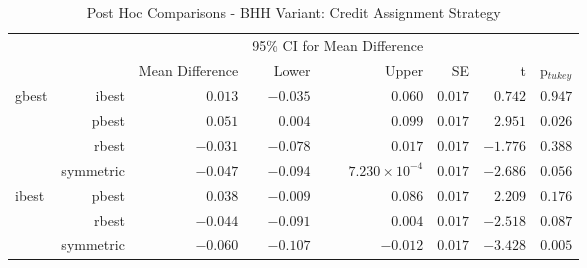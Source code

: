 \begin{table}[htb]
	\centering
	\caption{Post Hoc Comparisons - BHH Variant: Credit Assignment Strategy}
	\label{tab:results:credit:post_hoc}%
	\par\bigskip
	\resizebox{\textwidth}{!}
	{
		\begin{tabular}{lrrrrrrr}
			\toprule
			\multicolumn{1}{c}{} & \multicolumn{1}{c}{} & \multicolumn{1}{c}{} & \multicolumn{2}{c}{95\% CI for Mean Difference} & \multicolumn{1}{c}{} & \multicolumn{1}{c}{} & \multicolumn{1}{c}{}               \\
			\cline{4-5}
			$ $                  & $ $                  & Mean Difference      & Lower                                           & Upper                & SE                   & t                    & p$_{tukey}$ \\
			\cmidrule[0.4pt]{1-8}
			gbest                & ibest                & $0.013$              & $-0.035$                                        & $0.060$              & $0.017$              & $0.742$              & $0.947$     \\
			$ $                  & pbest                & $0.051$              & $0.004$                                         & $0.099$              & $0.017$              & $2.951$              & $0.026$     \\
			                     & rbest                & $-0.031$             & $-0.078$                                        & $0.017$              & $0.017$              & $-1.776$             & $0.388$     \\
			                     & symmetric            & $-0.047$             & $-0.094$                                        & $7.230\times10^{-4}$ & $0.017$              & $-2.686$             & $0.056$     \\
			ibest                & pbest                & $0.038$              & $-0.009$                                        & $0.086$              & $0.017$              & $2.209$              & $0.176$     \\
			$ $                  & rbest                & $-0.044$             & $-0.091$                                        & $0.004$              & $0.017$              & $-2.518$             & $0.087$     \\
			                     & symmetric            & $-0.060$             & $-0.107$                                        & $-0.012$             & $0.017$              & $-3.428$             & $0.005$     \\

\end{tabular}}
\end{table}
